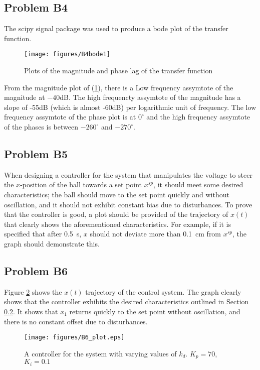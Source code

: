 \documentclass[a4paper,10pt,reqno]{amsart}
\numberwithin{equation}{section}
\begin{document}
\subsection{Problem B4}\label{sec:b4}
The scipy signal package was used to produce a bode plot of the transfer function.
\begin{figure}[h]
\centering
\texttt{[image: figures/B4bode1]}
\caption{Plots of the magnitude and phase lag of the transfer function}
\label{fig:B4bode}
\end{figure}
From the magnitude plot of (\ref{fig:B4bode}), there is a Low frequency assymtote of the magnitude at $-40$dB. The high frequencty assymtote of the magnitude has a slope of -55dB (which is almost -60dB) per logarithmic unit of frequency. The low frequency assymtote of the phase plot is at $0^\circ$ and the high frequency assymtote of the phases is between $-260^{\circ}$ and $-270^{\circ}$.

\subsection{Problem B5}\label{sec:b5}

When designing a controller for the system that manipulates the voltage to steer the $x$-position of the ball towards a set point $x^{sp}$, it should meet some desired characteristics; the ball should move to the set point quickly and without oscillation, and it should not exhibit constant bias due to disturbances. To prove that the controller is good, a plot should be provided of the trajectory of $x(t)$ that clearly shows the aforementioned characteristics. For example, if it is specified that after 0.5~s, $x$ should not deviate more than 0.1~cm from $x^{sp}$, the graph should demonstrate this.

\subsection{Problem B6} Figure \ref{fig:B6_plot} shows the $x(t)$ trajectory of the control system. The graph clearly shows that the controller exhibits the desired characteristics outlined in Section \ref{sec:b5}. It shows that $x_1$ returns quickly to the set point without oscillation, and there is no constant offset due to disturbances.

\begin{figure}[h]
     \texttt{[image: figures/B6\_plot.eps]}
     \caption{A controller for the system with varying values of $k_d$. $K_p = 70$, $K_i = 0.1$}
     \label{fig:B6_plot}
\end{figure}
\end{document}

